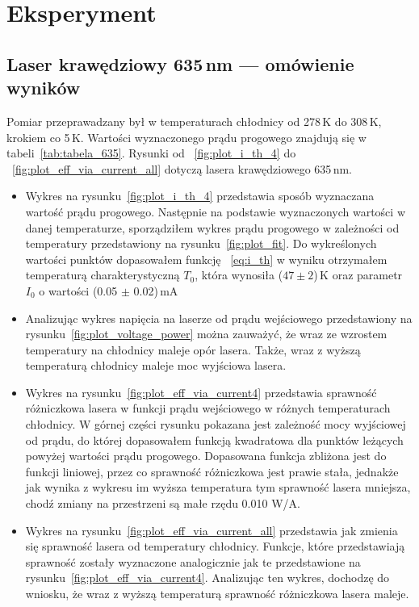 \section{Eksperyment}
\subsection{Laser krawędziowy 635\,nm --- omówienie wyników}
Pomiar przeprawadzany był w temperaturach chłodnicy od 278\,K do 308\,K, krokiem co 5\,K. Wartości wyznaczonego prądu progowego
znajdują się w tabeli~\ref{tab:tabela_635}. Rysunki od ~\ref{fig:plot_i_th_4} do ~\ref{fig:plot_eff_via_current_all} dotyczą lasera
krawędziowego 635\,nm.
\begin{itemize}
\item Wykres na rysunku~\ref{fig:plot_i_th_4} przedstawia sposób wyznaczana wartość prądu progowego. Następnie na podstawie
wyznaczonych wartości w danej temperaturze, sporządziłem wykres prądu progowego w zależności od temperatury
przedstawiony na rysunku~\ref{fig:plot_fit}. Do wykreślonych wartości punktów dopasowałem funkcję ~\ref{eq:i_th} w wyniku otrzymałem
 temperaturą charakterystyczną $T_0$, która wynosiła ($47 \pm 2$)\,K oraz parametr $I_0$ o wartości (0.05 $\pm$ 0.02)\,mA
\item Analizując wykres napięcia na laserze od prądu wejściowego przedstawiony na rysunku~\ref{fig:plot_voltage_power}
można zauważyć, że wraz ze wzrostem temperatury na chłodnicy
maleje opór lasera. Także, wraz z wyższą temperaturą chłodnicy maleje moc wyjściowa lasera.
\item Wykres na rysunku~\ref{fig:plot_eff_via_current4} przedstawia sprawność różniczkowa lasera w funkcji prądu wejściowego
w różnych temperaturach chłodnicy. W górnej części rysunku pokazana jest zależność mocy wyjściowej od prądu, do której dopasowałem
funkcją kwadratowa dla punktów leżących powyżej wartości prądu progowego. Dopasowana funkcja zbliżona jest do funkcji liniowej, przez co sprawność różniczkowa jest
prawie stała, jednakże jak wynika z wykresu im wyższa temperatura tym sprawność lasera mniejsza, chodź zmiany na
przestrzeni są małe rzędu 0.010 W/A.
\item Wykres na rysunku~\ref{fig:plot_eff_via_current_all} przedstawia jak zmienia się sprawność lasera od temperatury chłodnicy.
Funkcje, które przedstawiają sprawność zostały wyznaczone analogicznie jak te przedstawione na rysunku~\ref{fig:plot_eff_via_current4}.
Analizując ten wykres, dochodzę do wniosku, że wraz z wyższą temperaturą sprawność różniczkowa lasera maleje.
\end{itemize}
